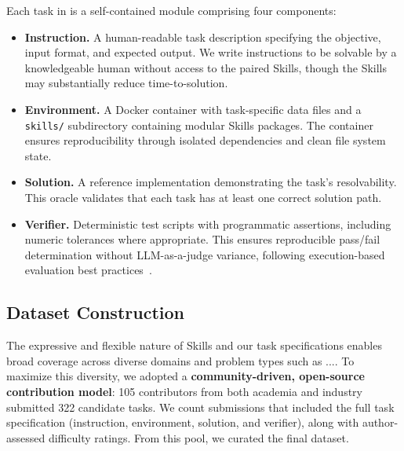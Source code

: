 Each task in \benchmarkName{} is a self-contained module comprising four components:
\begin{itemize}[nosep,leftmargin=*]
\item \textbf{Instruction.} A human-readable task description specifying the objective, input format, and expected output. We write instructions to be solvable by a knowledgeable human without access to the paired Skills, though the Skills may substantially reduce time-to-solution.

\item \textbf{Environment.} A Docker container with task-specific data files and a \texttt{skills/} subdirectory containing modular Skills packages. The container ensures reproducibility through isolated dependencies and clean file system state.

\item \textbf{Solution.} A reference implementation demonstrating the task's resolvability. This oracle validates that each task has at least one correct solution path.

\item \textbf{Verifier.} Deterministic test scripts with programmatic assertions, including numeric tolerances where appropriate. This ensures reproducible pass/fail determination without LLM-as-a-judge variance, following execution-based evaluation best practices~\citep{wang2023execution, brown_verifiers_2025}.
\end{itemize}
\subsection{Dataset Construction}
The expressive and flexible nature of Skills and our task specifications enables broad coverage across diverse domains and problem types such as ....
To maximize this diversity, we adopted a \textbf{community-driven, open-source contribution model}: 105 contributors from both academia and industry submitted 322 candidate tasks.
We count submissions that included the full task specification
(instruction, environment, solution, and verifier),
along with author-assessed difficulty ratings.
From this pool, we curated the final \benchmarkName{} dataset. 



